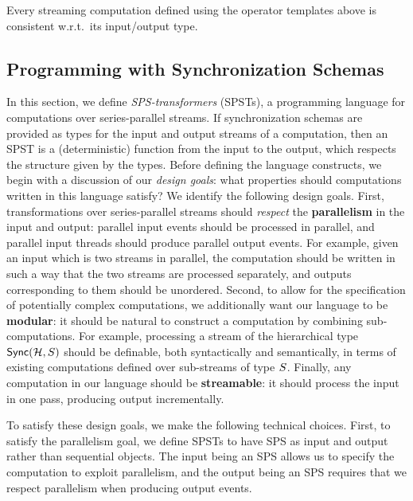 \begin{theorem}
\normalfont
Every streaming computation defined using the operator templates above is consistent w.r.t.\ its input/output type.
\end{theorem}

\subsection{Programming with Synchronization Schemas}

In this section, we define \emph{SPS-transformers} (SPSTs), a programming language for computations over series-parallel streams.
If synchronization schemas are provided as types for the input and output streams of a computation,
then an SPST is a (deterministic) function from the input to the output, which respects the structure given by the types.
Before defining the language constructs, we begin with a discussion of our \emph{design goals}: what properties should computations written in this language satisfy?
We identify the following design goals.
First,
transformations over series-parallel streams should \emph{respect} the \textbf{parallelism}
in the input and output: parallel input events should be processed in parallel,
and parallel input threads should produce parallel output events.
For example, given an input which is two streams in parallel, the computation should be written in such a way that the two streams are processed separately, and outputs corresponding to them should be unordered.
Second,
to allow for the specification of potentially complex computations, we additionally want our language to be \textbf{modular}: it should be natural to construct a computation by combining sub-computations.
For example, processing a stream of the hierarchical type $\hier{\mathcal{H}}{\ss}$
should be definable, both syntactically and semantically, in terms of
existing computations defined over sub-streams of type $\ss$.
Finally, any computation in our language should be \textbf{streamable}: it should process the input in one pass, producing output incrementally.

To satisfy these design goals, we make the following technical choices.
First, to satisfy the parallelism goal, we define SPSTs to have SPS as input and output rather than sequential objects.
The input being an SPS allows us to specify the computation to exploit parallelism,
and the output being an SPS requires that we respect parallelism when producing output events.


